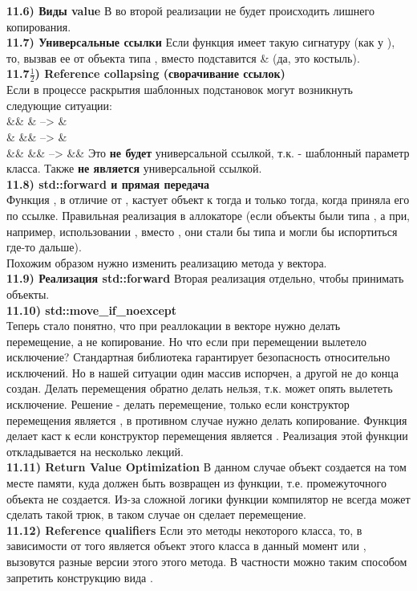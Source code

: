 \documentclass{article}
\begin{document}
\noindent \textbf{11.6) Виды value}
В во второй реализации не будет происходить лишнего копирования.\\
\noindent \textbf{11.7) Универсальные ссылки}
Если функция имеет такую сигнатуру (как у ), то, вызвав ее от  объекта типа , вместо  подставится \& (да, это костыль).\\
\noindent \textbf{11.7$\frac{1}{2}$) Reference collapsing (сворачивание ссылок)}\\
Если в процессе раскрытия шаблонных подстановок могут возникнуть следующие ситуации:\\
\&\& \&  --> \&\\
\& \&\&  --> \&\\
\&\& \&\&  --> \&\&
Это \textbf{не будет} универсальной ссылкой, т.к.  - шаблонный параметр класса.
Также \textbf{не является} универсальной ссылкой.\\
\noindent \textbf{11.8) std::forward и прямая передача}\\
Функция , в отличие от , кастует объект к  тогда и только тогда, когда приняла его по  ссылке.
Правильная реализация  в аллокаторе (если объекты были типа , а при, например, использовании , вместо , они стали бы типа  и могли бы испортиться где-то дальше).\\ Похожим образом нужно изменить реализацию метода  у вектора.\\
\noindent \textbf{11.9) Реализация std::forward}
Вторая реализация отдельно, чтобы принимать  объекты.\\
\noindent \textbf{11.10) std::move\_if\_noexcept}\\
Теперь стало понятно, что при реаллокации в векторе нужно делать перемещение, а не копирование. Но что если при перемещении вылетело исключение? Стандартная библиотека гарантирует безопасность относительно исключений. Но в нашей ситуации один массив испорчен, а другой не до конца создан. Делать перемещения обратно делать нельзя, т.к. может опять вылететь исключение. Решение - делать перемещение, только если конструктор перемещения является , в противном случае нужно делать копирование. Функция  делает каст к  если конструктор перемещения является . Реализация этой функции откладывается на несколько лекций.\\
\noindent \textbf{11.11) Return Value Optimization}
В данном случае объект  создается на том месте памяти, куда должен быть возвращен из функции, т.е. промежуточного объекта не создается. Из-за сложной логики функции компилятор не всегда может сделать такой трюк, в таком случае он сделает перемещение.\\
\noindent \textbf{11.12) Reference qualifiers}
Если это методы некоторого класса, то, в зависимости от того является объект этого класса в данный момент  или , вызовутся разные версии этого этого метода. В частности можно таким способом запретить конструкцию вида .
\end{document}
